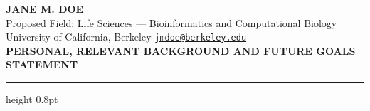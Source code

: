 \documentclass[11pt,letterpaper]{article}
\begin{document}
\color{darkgray}


\begin{center}
    {\fontsize{12pt}{14pt}\selectfont \textbf{\textcolor{accent}{JANE M. DOE}}} \\
    \vspace{2pt}
    {\fontsize{9.5pt}{11pt}\selectfont Proposed Field: Life Sciences --- Bioinformatics and Computational Biology} \\
    {\fontsize{9.5pt}{11pt}\selectfont University of California, Berkeley \quad \textbullet \quad \href{mailto:jmdoe@berkeley.edu}{\texttt{jmdoe@berkeley.edu}}} \\
    \vspace{4pt}
    {\fontsize{10.5pt}{12pt}\selectfont \textbf{PERSONAL, RELEVANT BACKGROUND AND FUTURE GOALS STATEMENT}}
\end{center}
\vspace{-8pt}
\textcolor{accent}{\hrule height 0.8pt}
\vspace{6pt}









\end{document}
